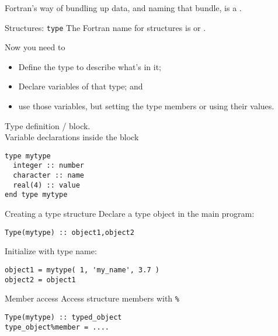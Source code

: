 
Fortran's way of bundling up data, and naming that bundle, is a
.

\begin{slide}{Structures: \noexpand\texttt{type}}
  \label{sl:ftype}
  The Fortran name for structures is  or
  .
\end{slide}

Now you need to
\begin{itemize}
\item Define the type to describe what's in it;
\item Declare variables of that type; and
\item use those variables, but setting the type members or using their
  values.
\end{itemize}

\begin{block}{Type definition}
  \label{sl:ftype-def}
   /  block.\\
  Variable declarations inside the block
\begin{verbatim}
type mytype
  integer :: number
  character :: name
  real(4) :: value
end type mytype
\end{verbatim}
\end{block}

\begin{block}{Creating a type structure}
  \label{sl:ftype-set}
  Declare a type object in the main program:
\begin{verbatim}
Type(mytype) :: object1,object2
\end{verbatim}
 Initialize with type name:
\begin{verbatim}
object1 = mytype( 1, 'my_name', 3.7 )
object2 = object1
\end{verbatim}
\end{block}

\begin{block}{Member access}
  \label{sl:ftype-access}
  Access structure members with \verb+%+
\begin{verbatim}
Type(mytype) :: typed_object
type_object%member = ....  
\end{verbatim}
\end{block}

